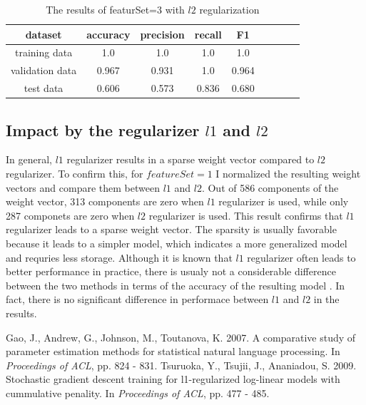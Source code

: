 \begin{table}[!h]
  \begin{center}
  \begin{tabular}{|c|c|c|c|c|c|c|c|c|} \hline
    dataset & accuracy & precision & recall & F1 \\ \hline
    training data & 1.0 & 1.0 & 1.0 & 1.0 \\ \hline
    validation data & 0.967 & 0.931 & 1.0 & 0.964 \\ \hline
    test data & 0.606 & 0.573 & 0.836 & 0.680 \\ \hline
  \end{tabular}
  \caption{The results of featurSet=3 with $l2$ regularization}
  \label{tab:result_3_l2}
  \end{center}
\end{table}

\subsection*{Impact by the regularizer $l1$ and $l2$}
In general, $l1$ regularizer results in a sparse weight vector compared to $l2$ regularizer. To confirm this, for $featureSet=1$ I normalized the resulting weight vectors and compare them between $l1$ and $l2$. Out of 586 components of the weight vector, 313 components are zero when $l1$ regularizer is used, while only 287 componets are zero when $l2$ regularizer is used. This result confirms that $l1$ regularizer leads to a sparse weight vector. The sparsity is usually favorable because it leads to a simpler model, which indicates a more generalized model and requries less storage. Although it is known that $l1$ regularizer often leads to better performance in practice, there is usualy not a considerable difference between the two methods in terms of the accuracy of the resulting model \cite{gao2007, tsuruoka2009}. In fact, there is no significant difference in performace between $l1$ and $l2$ in the results.

\begin{thebibliography}{9}
 Gao, J., Andrew, G., Johnson, M., Toutanova, K. 2007. A comparative study of parameter estimation methods for statistical natural language processing. In {\it Proceedings of ACL}, pp. 824 - 831.
 Tsuruoka, Y., Tsujii, J., Ananiadou, S. 2009. Stochastic gradient descent training for l1-regularized log-linear models with cummulative penality. In {\it Proceedings of ACL}, pp. 477 - 485.
\end{thebibliography}



